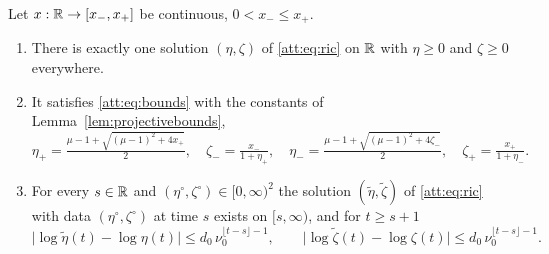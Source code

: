 \begin{proposition}\label{prop:riccatientire}
Let $x:\mathbb R\to[x_-,x_+]$ be continuous, $0<x_-\le x_+$.
\begin{enumerate}[label=\textup{(\roman*)}]
\item There is exactly one solution $(\eta,\zeta)$ of \eqref{att:eq:ric} on $\mathbb R$ with $\eta\ge0$ and $\zeta\ge0$ everywhere.
\item It satisfies \eqref{att:eq:bounds} with the constants of Lemma~\ref{lem:projectivebounds},
\begin{equation}\label{att:eq:constants}
\eta_+=\tfrac{\mu-1+\sqrt{(\mu-1)^2+4x_+}}2,\quad \zeta_-=\tfrac{x_-}{1+\eta_+},\quad
\eta_-=\tfrac{\mu-1+\sqrt{(\mu-1)^2+4\zeta_-}}2,\quad \zeta_+=\tfrac{x_+}{1+\eta_-}.
\end{equation}
\item For every $s\in\mathbb R$ and $(\eta^\circ,\zeta^\circ)\in[0,\infty)^2$ the solution $(\tilde\eta,\tilde\zeta)$ of \eqref{att:eq:ric} with data $(\eta^\circ,\zeta^\circ)$ at time $s$ exists on $[s,\infty)$, and for $t\ge s+1$
\begin{equation}\label{att:eq:pullback}
\bigl|\log\tilde\eta(t)-\log\eta(t)\bigr|\le d_0\,\nu_0^{\lfloor t-s\rfloor-1},\qquad
\bigl|\log\tilde\zeta(t)-\log\zeta(t)\bigr|\le d_0\,\nu_0^{\lfloor t-s\rfloor-1}.
\end{equation}
\end{enumerate}
\end{proposition}
